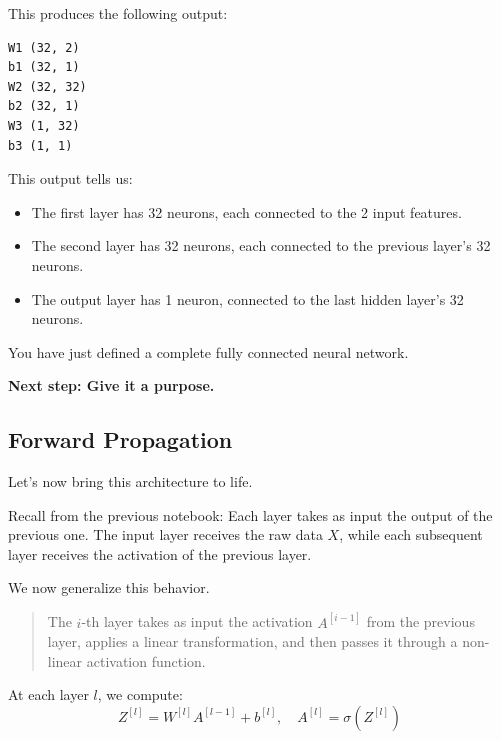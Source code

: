 \documentclass[11pt]{article}
\begin{document}
\vspace{0.5em}

This produces the following output:

\begin{verbatim}
W1 (32, 2)
b1 (32, 1)
W2 (32, 32)
b2 (32, 1)
W3 (1, 32)
b3 (1, 1)
\end{verbatim}

\vspace{1em}

\noindent This output tells us:
\begin{itemize}
  \item The first layer has 32 neurons, each connected to the 2 input features.
  \item The second layer has 32 neurons, each connected to the previous layer's 32 neurons.
  \item The output layer has 1 neuron, connected to the last hidden layer's 32 neurons.
\end{itemize}

You have just defined a complete fully connected neural network.

\vspace{2em}
\begin{center}
\LARGE \textbf{Next step: Give it a purpose.}
\end{center}


\subsection*{Forward Propagation}

Let’s now bring this architecture to life.

\bigskip

\noindent
Recall from the previous notebook:  
Each layer takes as input the output of the previous one.  
The input layer receives the raw data $X$, while each subsequent layer receives the activation of the previous layer.

\medskip

We now generalize this behavior.

\begin{quote}
The $i$-th layer takes as input the activation $A^{[i-1]}$ from the previous layer, applies a linear transformation, and then passes it through a non-linear activation function.
\end{quote}

\medskip

At each layer $l$, we compute:
\[
Z^{[l]} = W^{[l]} A^{[l-1]} + b^{[l]}, \quad A^{[l]} = \sigma(Z^{[l]})
\]
\end{document}
